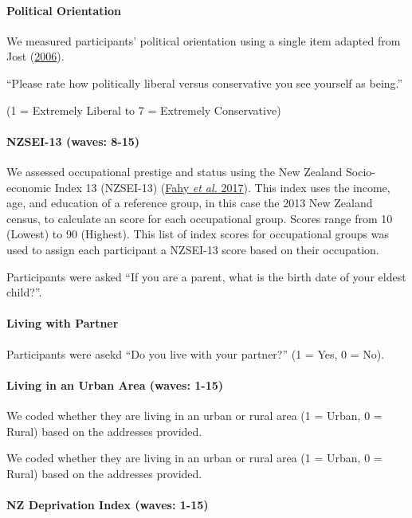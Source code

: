 \documentclass[
  singlecolumn,
  9pt]{article}
\let\oldparagraph\paragraph
\renewcommand{\paragraph}[1]{\oldparagraph{#1}\mbox{}}
\begin{document}
\paragraph{Political Orientation}\label{political-orientation}

We measured participants' political orientation using a single item
adapted from Jost (\hyperref[ref-jost_end_2006-1]{2006}).

``Please rate how politically liberal versus conservative you see
yourself as being.''

(1 = Extremely Liberal to 7 = Extremely Conservative)

\paragraph{NZSEI-13 (waves: 8-15)}\label{nzsei-13-waves-8-15}

We assessed occupational prestige and status using the New Zealand
Socio-economic Index 13 (NZSEI-13) (\hyperref[ref-fahy2017]{Fahy
\emph{et al.} 2017}). This index uses the income, age, and education of
a reference group, in this case the 2013 New Zealand census, to
calculate an score for each occupational group. Scores range from 10
(Lowest) to 90 (Highest). This list of index scores for occupational
groups was used to assign each participant a NZSEI-13 score based on
their occupation.

Participants were asked ``If you are a parent, what is the birth date of
your eldest child?''.

\paragraph{Living with Partner}\label{living-with-partner}

Participants were asekd ``Do you live with your partner?'' (1 = Yes, 0 =
No).

\paragraph{Living in an Urban Area (waves:
1-15)}\label{living-in-an-urban-area-waves-1-15}

We coded whether they are living in an urban or rural area (1 = Urban, 0
= Rural) based on the addresses provided.

We coded whether they are living in an urban or rural area (1 = Urban, 0
= Rural) based on the addresses provided.

\paragraph{NZ Deprivation Index (waves:
1-15)}\label{nz-deprivation-index-waves-1-15}
\end{document}
